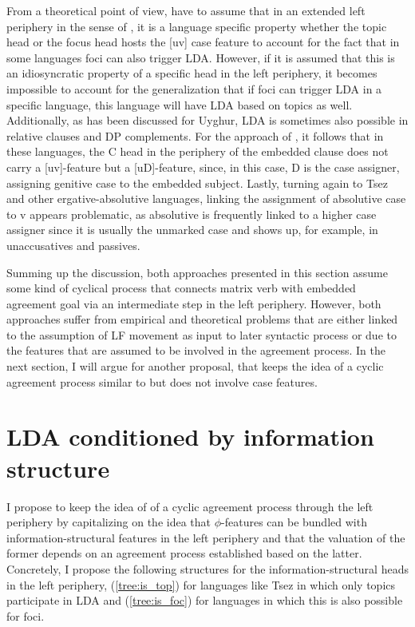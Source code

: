 \documentclass[output=paper
,modfonts
,nonflat]{langsci/langscibook}
\begin{document}
From a theoretical point of view, \citet{Bjorkman_Zeijlstra2014} have to assume that in an extended left periphery in the sense of \citet{Rizzi1997}, it is a language specific property whether the topic head or the focus head hosts the [uv] case feature to account for the fact that in some languages foci can also trigger LDA. However, if it is assumed that this is an idiosyncratic property of a specific head in the left periphery, it becomes impossible to account for the generalization that if foci can trigger LDA in a specific language, this language will have LDA based on topics as well. Additionally, as has been discussed for Uyghur, LDA is sometimes also possible in relative clauses and DP complements. For the approach of \citet{Bjorkman_Zeijlstra2014}, it follows that in these languages, the C head in the periphery of the embedded clause does not carry a [uv]-feature but a [uD]-feature, since, in this case, D is the case assigner, assigning genitive case to the embedded subject. Lastly, turning again to Tsez and other ergative-absolutive languages, linking the assignment of absolutive case to v appears problematic, as absolutive is frequently linked to a higher case assigner since it is usually the unmarked case and shows up, for example, in unaccusatives and passives.

Summing up the discussion, both approaches presented in this section assume some kind of cyclical process that connects matrix verb with embedded agreement goal via an intermediate step in the left periphery. However, both approaches suffer from empirical and theoretical problems that are either linked to the assumption of LF movement as input to later syntactic process or due to the features that are assumed to be involved in the agreement process. In the next section, I will argue for another proposal, that keeps the idea of a cyclic agreement process similar to \citet{Bjorkman_Zeijlstra2014} but does not involve case features.

\section{LDA conditioned by information structure}
\label{sec:mursell:4}

I propose to keep the idea of \citet{Bjorkman_Zeijlstra2014} of a cyclic agreement process through the left periphery by capitalizing on the idea that $ \phi $-features can be bundled with information-structural features in the left periphery and that the valuation of the former depends on an agreement process established based on the latter. Concretely, I propose the following structures for the information-structural heads in the left periphery, (\ref{tree:is_top}) for languages like Tsez in which only topics participate in LDA and (\ref{tree:is_foc}) for languages in which this is also possible for foci.
\end{document}
